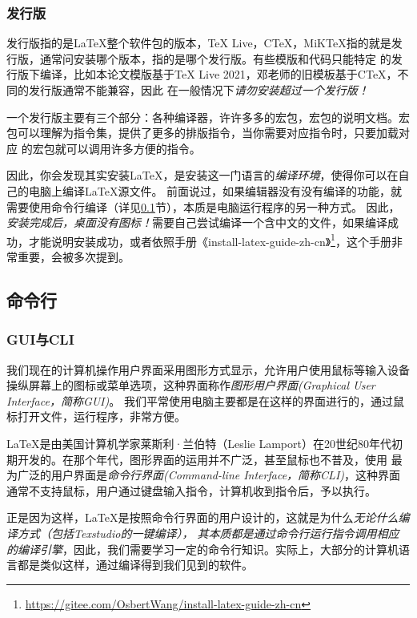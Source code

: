 \subsubsection{发行版}


发行版指的是\LaTeX{}整个软件包的版本，\TeX{} Live，C\TeX{}，MiK\TeX{}指的就是发行版，通常问安装哪个版本，指的是哪个发行版。有些模版和代码只能特定
的发行版下编译，比如本论文模版基于\TeX{} Live 2021，邓老师的旧模板基于C\TeX{}，不同的发行版通常不能兼容，因此
在一般情况下\emph{请勿安装超过一个发行版！}

一个发行版主要有三个部分：各种编译器，许许多多的宏包，宏包的说明文档。宏包可以理解为指令集，提供了更多的排版指令，当你需要对应指令时，只要加载对应
的宏包就可以调用许多方便的指令。

因此，你会发现其实安装\LaTeX{}，是安装这一门语言的\emph{编译环境}，使得你可以在自己的电脑上编译\LaTeX{}源文件。
前面说过，如果编辑器没有没有编译的功能，就需要使用命令行编译（详见\ref{subsec:mlh}节），本质是电脑运行程序的另一种方式。
因此，\emph{安装完成后，桌面没有图标！}需要自己尝试编译一个含中文的文件，如果编译成功，才能说明安装成功，或者依照手册《install-latex-guide-zh-cn》\footnote{\url{https://gitee.com/OsbertWang/install-latex-guide-zh-cn}}，这个手册非常重要，会被多次提到。




\subsection{命令行}\label{subsec:mlh}


\subsubsection{GUI与CLI}


我们现在的计算机操作用户界面采用图形方式显示，允许用户使用鼠标等输入设备操纵屏幕上的图标或菜单选项，这种界面称作\emph{图形用户界面(Graphical User Interface，简称GUI)}。
我们平常使用电脑主要都是在这样的界面进行的，通过鼠标打开文件，运行程序，非常方便。

\LaTeX{}是由美国计算机学家莱斯利·兰伯特（Leslie Lamport）在20世纪80年代初期开发的。在那个年代，图形界面的运用并不广泛，甚至鼠标也不普及，使用
最为广泛的用户界面是\emph{命令行界面(Command-line Interface，简称CLI)}，这种界面通常不支持鼠标，用户通过键盘输入指令，计算机收到指令后，予以执行。

正是因为这样，\LaTeX{}是按照命令行界面的用户设计的，这就是为什么\emph{无论什么编译方式（包括Texstudio的一键编译），
其本质都是通过命令行运行指令调用相应的编译引擎}，因此，我们需要学习一定的命令行知识。实际上，大部分的计算机语言都是类似这样，通过编译得到我们见到的软件。




